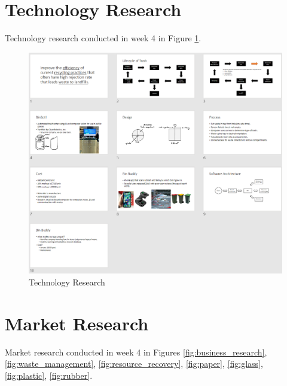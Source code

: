\documentclass[11pt, a4, nocenter, margin=150mm]{article}
\begin{document}
\begin{appendices}
\section{Technology Research}
\label{app:technology_research}

	Technology research conducted in week 4 in Figure \ref{fig:technology_research}.

	\begin{figure}[h!]
		\centering
		\includegraphics[width=\textwidth]{week4/technology_research.png}
		\caption{Technology Research}
		\label{fig:technology_research}
	\end{figure}

\pagebreak

\section{Market Research}
\label{app:market_research}

	Market research conducted in week 4 in Figures \ref{fig:business_research}, \ref{fig:waste_management}, \ref{fig:resource_recovery}, \ref{fig:paper}, \ref{fig:glass}, \ref{fig:plastic}, \ref{fig:rubber}.


\end{appendices}
\end{document}
